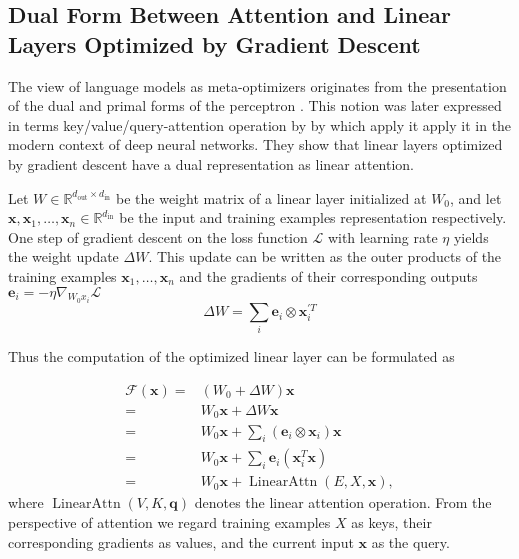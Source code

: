 \subsection{Dual Form Between Attention and Linear Layers Optimized by Gradient Descent}
\label{sec:icl_dual_1}

The view of language models as meta-optimizers originates from the presentation of the dual and primal forms of the perceptron \cite{Aizerman2019TheoreticalFO}.
This notion was later expressed in terms key/value/query-attention operation by by \cite{irie22dual,dai2023gpt,pmlr-v202-von-oswald23a} which apply it apply it in the modern context of deep neural networks.
They show that linear layers optimized by gradient descent have a dual representation as linear attention.

Let $W \in \mathbb{R}^{d_{\text{out}} \times d_{\text{in}}}$ be the weight matrix of a linear layer initialized at $W_0$, and let $\mathbf{x}, \mathbf{x}_1, \dots, \mathbf{x}_n  \in \mathbb{R}^{d_{\text{in}}}$ be the input and training examples representation respectively.
One step of gradient descent on the loss function $\mathcal{L}$ with learning rate $\eta$ yields the weight update $\Delta W$.
This update can be written as the outer products of the training examples $\mathbf{x}_1, \dots, \mathbf{x}_n$ and the gradients of their corresponding outputs $\mathbf{e}_i = -\eta \nabla_{W_0 x_i}\mathcal{L}$
\begin{equation}
    \Delta W = \sum_i \mathbf{e}_i \otimes \mathbf{x}^{\prime T}_i
    \label{equ:dual_comp_2}
\end{equation}

Thus the computation of the optimized linear layer can be formulated as 

\begin{equation}
    \begin{aligned}
        \mathcal{F}(\mathbf{x}) = & \left( W_{0} + \Delta W \right) \mathbf{x} \\
        = & W_{0} \mathbf{x} + \Delta W \mathbf{x} \\
        = & W_{0} \mathbf{x} + \sum_i \left( \mathbf{e}_i \otimes \mathbf{x}_i\right) \mathbf{x} \\
        = & W_{0} \mathbf{x} + \sum_i \mathbf{e}_i \left( \mathbf{x}^{T}_i \mathbf{x} \right) \\
        = & W_{0} \mathbf{x} + \operatorname{LinearAttn} \left( E, X, \mathbf{x} \right), 
    \end{aligned}
    \label{equ:sgd_attn_dual}
\end{equation}
where $\operatorname{LinearAttn}(V, K, \mathbf{q})$ denotes the linear attention operation.
From the perspective of attention we regard training examples $X$ as keys, their corresponding gradients as values, and the current input $\mathbf{x}$ as the query.


